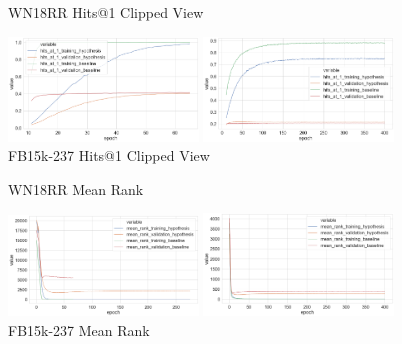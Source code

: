 \begin{figure}[H]
	\parbox{.5\linewidth}{
   		\caption{WN18RR Hits@1 Clipped View}
   		\centering
    		\includegraphics[width=0.45\textwidth, height=0.2\textheight]{WN18RR_hits_at_1_Results_Clipped}
		}
	\hfill
	\parbox{.5\linewidth}{
		\caption{FB15k-237 Hits@1  Clipped View}
   		\centering
		\includegraphics[width=0.45\textwidth, height=0.2\textheight]{FB15k-237_hits_at_1_Results_Clipped}
		}
\end{figure}


\begin{figure}[H]
	\parbox{.5\linewidth}{
   		\caption{WN18RR Mean Rank}
   		\centering
    		\includegraphics[width=0.45\textwidth, height=0.2\textheight]{WN18RR_mean_rank_Results}
		}
	\hfill
	\parbox{.5\linewidth}{
		\caption{FB15k-237 Mean Rank}
   		\centering
		\includegraphics[width=0.45\textwidth, height=0.2\textheight]{FB15k-237_mean_rank_Results}
		}
\end{figure}

